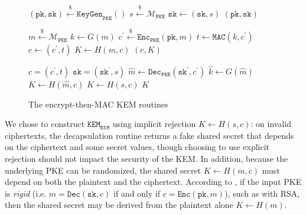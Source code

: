 \documentclass[runningheads]{llncs}
\newcommand{\pke}{\texttt{PKE}}
\newcommand{\keygen}{\texttt{KeyGen}}
\newcommand{\encrypt}{\texttt{Enc}}
\newcommand{\decrypt}{\texttt{Dec}}
\newcommand{\kem}{\texttt{KEM}}
\newcommand{\encap}{\texttt{Encap}}
\newcommand{\decap}{\texttt{Decap}}
\newcommand{\etm}{\texttt{EtM}}  %
\newcommand{\mac}{\texttt{MAC}}
\newcommand{\pk}{\texttt{pk}}
\newcommand{\sk}{\texttt{sk}}
\newcommand{\leftsample}{\stackrel{\$}{\leftarrow}}
\begin{document}
\begin{figure}[h]
    \centering
    \begin{minipage}[t]{0.32\textwidth}
    \begin{algorithm}[H]
        \caption*{$\keygen_\etm()$}
        \begin{algorithmic}[1]
            \State $(\pk,  \sk) \leftsample \keygen_\pke()$
            \State $s \leftsample \mathcal{M}_\pke$
            \State $\sk \leftarrow (\sk, s)$
            \State \Return $(\pk, \sk)$
        \end{algorithmic}
    \end{algorithm}
    \end{minipage}\hfill
    \begin{minipage}[t]{0.3\textwidth}
    \begin{algorithm}[H]
        \caption*{$\encap_\etm(\pk)$}
        \begin{algorithmic}[1]
            \State $m \leftsample \mathcal{M}_\pke$
            \State $k \leftarrow G(m)$
            \State $c^\prime \leftsample \encrypt_\pke(\pk, m)$
            \State $t \leftarrow \mac(k, c^\prime)$
            \State $c \leftarrow (c^\prime, t)$
            \State $K \leftarrow H(m, c)$
            \State \Return $(c, K)$
        \end{algorithmic}
    \end{algorithm}
    \end{minipage}\hfill
    \begin{minipage}[t]{0.33\textwidth}
    \begin{algorithm}[H]
        \caption*{$\decap_\etm(\sk, c)$}
        \begin{algorithmic}[1]
            \Require $c = (c^\prime, t)$
            \Require $\sk = (\sk^\prime, s)$
            \State $\hat{m} \leftarrow \decrypt_\pke(\sk^\prime, c^\prime)$
            \State $\hat{k} \leftarrow G(\hat{m})$
            \If{$\mac(\hat{k}, c^\prime) = t$}
                \State $K \leftarrow H(\hat{m}, c)$
            \Else 
                \State $K \leftarrow H(s, c)$
            \EndIf
            \State \Return $K$
        \end{algorithmic}
    \end{algorithm}
    \end{minipage}
    \caption{The encrypt-then-MAC KEM routines}\label{fig:etm-routines}
\end{figure}

We chose to construct $\kem_\etm$ using implicit rejection $K \leftarrow H(s, c)$: on invalid ciphertexts, the decapsulation routine returns a fake shared secret that depends on the ciphertext and some secret values, though choosing to use explicit rejection should not impact the security of the KEM. In addition, because the underlying PKE can be randomized, the shared secret $K \leftarrow H(m, c)$ must depend on both the plaintext and the ciphertext. According to \cite{DBLP:conf/ima/Dent03,DBLP:conf/tcc/HofheinzHK17}, if the input PKE is \textit{rigid} (i.e. $m = \decrypt(\sk, c)$ if and only if $c = \encrypt(\pk, m)$), such as with RSA, then the shared secret may be derived from the plaintext alone $K \leftarrow H(m)$.
\end{document}
